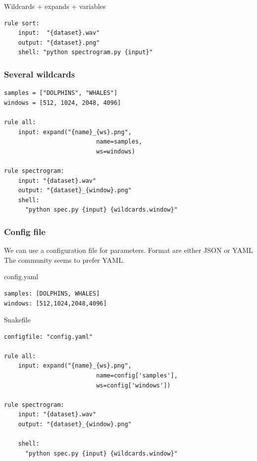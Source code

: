 \documentclass{beamer}
\begin{document}
\begin{frame}[fragile]
\begin{center}
\begin{minipage}{11cm}
\begin{onlyenv}
\begin{block}{Wildcards + expands + variables}
\begin{lstlisting}[basicstyle=\large]
rule sort:
    input:  "{dataset}.wav"
    output: "{dataset}.png"
    shell: "python spectrogram.py {input}"
           \end{lstlisting}     
  \end{block}
     \end{onlyenv}        
    \end{minipage}
 \end{center}
 
\end{frame}
        
      
\begin{frame}[fragile]
\frametitle{Several wildcards}
   \begin{minipage}{12cm}
  \begin{block}{}
            \begin{lstlisting}[basicstyle=\large]
samples = ["DOLPHINS", "WHALES"]
windows = [512, 1024, 2048, 4096]

rule all:
    input: expand("{name}_{ws}.png", 
                          name=samples, 
                          ws=windows)

rule spectrogram:
    input: "{dataset}.wav"
    output: "{dataset}_{window}.png"
    shell: 
      "python spec.py {input} {wildcards.window}"
            \end{lstlisting}
  \end{block}
\end{minipage}
\end{frame}
  
        

\begin{frame}[fragile]
    \frametitle{Config file}
     We can use a configuration file for parameters. Format are either JSON or YAML
    The community seems to prefer YAML.
    
    \begin{block}{config.yaml}
        \begin{lstlisting}
samples: [DOLPHINS, WHALES]
windows: [512,1024,2048,4096]
        \end{lstlisting}
    \end{block}
    \begin{block}{Snakefile}
    \begin{lstlisting}
configfile: "config.yaml"

rule all:
    input: expand("{name}_{ws}.png", 
                          name=config['samples'], 
                          ws=config['windows'])

rule spectrogram:
    input: "{dataset}.wav"
    output: "{dataset}_{window}.png"
    
    shell: 
      "python spec.py {input} {wildcards.window}"
    \end{lstlisting}
    \end{block}
\end{frame}
\end{document}
